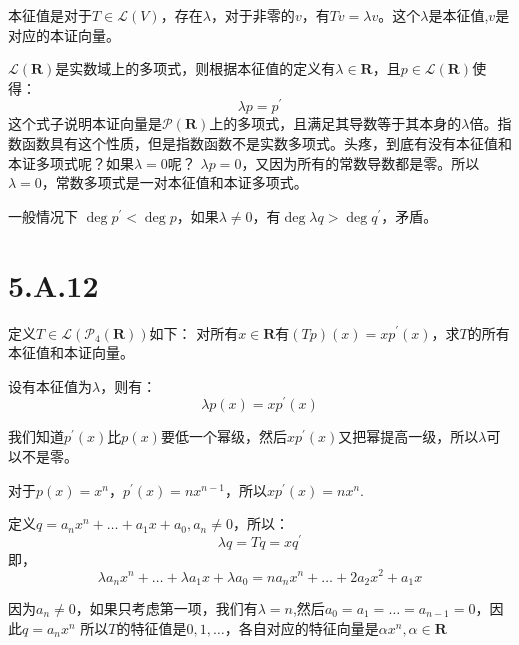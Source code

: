 \documentclass[10pt,a4paper,UTF8]{article}
\begin{document}
\begin{answer}
本征值是对于\(T\in \mathcal{L}(V)\)，存在\(\lambda\)，对于非零的\(v\)，有\(Tv = \lambda v\)。这个\(\lambda\)是本征值,\(v\)是对应的本证向量。

\(\mathcal{L}(\mathbf{R})\)是实数域上的多项式，则根据本征值的定义有\(\lambda \in \mathbf{R}\)，且\(p\in \mathcal{L}(\mathbf{R})\)使得：
\begin{equation}
\label{eq:8}
\lambda p = p^{'}
\end{equation}
这个式子说明本证向量是\(\mathcal{P}(\mathbf{R})\)上的多项式，且满足其导数等于其本身的\(\lambda\)倍。指数函数具有这个性质，但是指数函数不是实数多项式。头疼，到底有没有本征值和本证多项式呢？如果\(\lambda = 0\)呢？ \(\lambda p = 0\)，又因为所有的常数导数都是零。所以\(\lambda = 0\)，常数多项式是一对本征值和本证多项式。

一般情况下 \(\deg p^{'} < \deg p\)，如果\(\lambda \neq 0\)，有\(\deg \lambda q > \deg q^{'}\)，矛盾。
\end{answer}
\section{5.A.12}
\label{sec:org3ed6287}


\begin{problem}
定义\(T\in \mathcal{L}( \mathcal{P}_{4}(\mathbf{R}))\)如下： 对所有\(x\in \mathbf{R}\)有\((Tp)(x) = xp^{'}(x)\)，求\(T\)的所有本征值和本证向量。
\end{problem}

\begin{answer}
设有本征值为\(\lambda\)，则有：
\begin{equation}
\label{eq:9}
\lambda p(x) = xp^{'}(x)
\end{equation}

我们知道\(p^{'}(x)\)比\(p(x)\)要低一个幂级，然后\(xp^{'}(x)\)又把幂提高一级，所以\(\lambda\)可以不是零。

对于\(p(x) = x^{n}\)，\(p^{'}(x) = nx^{n-1}\)，所以\(xp^{'}(x) = nx^{n}\).

定义\(q = a_{n}x^{n} + \ldots + a_{1}x + a_{0},a_{n}\neq 0\)，所以：\[\lambda q =Tq = xq^{'}\]即，
\begin{equation}
\label{eq:10}
\lambda a_{n}x^{n} + \ldots + \lambda a_{1}x + \lambda a_{0} = na_{n}x^{n} + \ldots +  2a_{2}x^{2} + a_{1}x
\end{equation}

因为\(a_{n}\neq 0\)，如果只考虑第一项，我们有\(\lambda = n\),然后\(a_{0} = a_{1} = \ldots = a_{n-1} = 0\)，因此\(q = a_{n}x^{n}\) 所以\(T\)的特征值是\(0,1,\ldots\)，各自对应的特征向量是\(\alpha x^{n}, \alpha\in \mathbf{R}\)
\end{answer}
\end{document}
